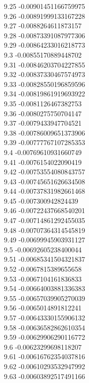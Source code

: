 {9.25	-0.00901451166759975\\
9.26	-0.00891999133167228\\
9.27	-0.0088264611873157\\
9.28	-0.00873391087977306\\
9.29	-0.00864233016218773\\
9.3	-0.00855170889448702\\
9.31	-0.00846203704227855\\
9.32	-0.00837330467574973\\
9.33	-0.00828550196859596\\
9.34	-0.00819861919693922\\
9.35	-0.0081126467382753\\
9.36	-0.0080275750704147\\
9.37	-0.0079433947704521\\
9.38	-0.00786009651373906\\
9.39	-0.00777767107285353\\
9.4	-0.00769610931660749\\
9.41	-0.0076154022090419\\
9.42	-0.00753554080843757\\
9.43	-0.00745651626634508\\
9.44	-0.00737831982661468\\
9.45	-0.007300942824439\\
9.46	-0.00722437668540201\\
9.47	-0.00714861292455035\\
9.48	-0.00707364314545819\\
9.49	-0.00699945903931127\\
9.5	-0.00692605238400044\\
9.51	-0.00685341504321837\\
9.52	-0.0067815389655658\\
9.53	-0.0067104161836833\\
9.54	-0.00664003881336383\\
9.55	-0.00657039905270039\\
9.56	-0.0065014891812241\\
9.57	-0.00643330155906132\\
9.58	-0.00636582862610354\\
9.59	-0.00629906290116772\\
9.6	-0.00623299698118207\\
9.61	-0.00616762354037816\\
9.62	-0.00610293532947992\\
9.63	-0.00603892517491166\\
}
